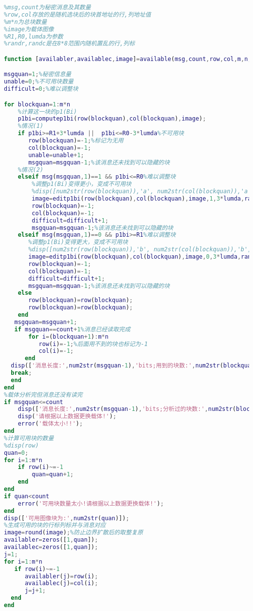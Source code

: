 \documentclass[lang=cn,11pt,a4paper,cite=super]{whureport}
\begin{document}
\begin{lstlisting}[language=Matlab]
%分析可用的图像块与秘密信息对应
%msg,count为秘密消息及其数量
%row,col存放的是随机选块后的块首地址的行,列地址值
%m*n为总块数量
%image为载体图像
%R1,R0,lumda为参数
%randr,randc是在8*8范围内随机置乱的行,列标

function [availabler,availablec,image]=available(msg,count,row,col,m,n,image,R1,R0,lumda,randr,randc);

msgquan=1;%秘密信息量
unable=0;%不可用块数量
difficult=0;%难以调整块

for blockquan=1:m*n
    %计算这一块的p1(Bi)
    p1bi=computep1bi(row(blockquan),col(blockquan),image);
    %情况(1)
    if p1bi>=R1+3*lumda ||  p1bi<=R0-3*lumda%不可用块   
       row(blockquan)=-1;%标记为无用
       col(blockquan)=-1;
       unable=unable+1;
       msgquan=msgquan-1;%该消息还未找到可以隐藏的块 
    %情况(2)
    elseif msg(msgquan,1)==1 && p1bi<=R0%难以调整块
        %调整p1(Bi)变得更小，变成不可用块
        %disp([num2str(row(blockquan)),'a', num2str(col(blockquan)),'a', num2str(msgquan)]);
        image=editp1bi(row(blockquan),col(blockquan),image,1,3*lumda,randr,randc);
        row(blockquan)=-1;
        col(blockquan)=-1;
        difficult=difficult+1;
        msgquan=msgquan-1;%该消息还未找到可以隐藏的块    
    elseif msg(msgquan,1)==0 && p1bi>=R1%难以调整块 
       %调整p1(Bi)变得更大，变成不可用块
       %disp([num2str(row(blockquan)),'b', num2str(col(blockquan)),'b', num2str(msgquan)]);
       image=editp1bi(row(blockquan),col(blockquan),image,0,3*lumda,randr,randc);
       row(blockquan)=-1;
       col(blockquan)=-1;
       difficult=difficult+1;
       msgquan=msgquan-1;%该消息还未找到可以隐藏的块 
    else    
       row(blockquan)=row(blockquan);
       row(blockquan)=row(blockquan);    
    end           
   msgquan=msgquan+1;
   if msgquan==count+1%消息已经读取完成
       for i=(blockquan+1):m*n
          row(i)=-1;%后面用不到的块也标记为-1
          col(i)=-1;
      end
  disp(['消息长度:',num2str(msgquan-1),'bits;用到的块数:',num2str(blockquan),';其中不可用块有:',num2str(unable),';另有',num2str(difficult),'块难以调整块已修改为不可用块'])
  break;    
  end
end
%载体分析完但消息还没有读完
if msgquan<=count  
    disp(['消息长度:',num2str(msgquan-1),'bits;分析过的块数:',num2str(blockquan),';其中不可用块有:',num2str(unable),';另有',num2str(difficult),'块难以调整块已修改为不可用块'])
    disp('请根据以上数据更换载体!');
    error('载体太小!!');
end
%计算可用块的数量
%disp(row)
quan=0; 
for i=1:m*n
    if row(i)~=-1
        quan=quan+1;
    end
end
if quan<count
    error('可用块数量太小!请根据以上数据更换载体!');
end
disp(['可用图像块为:',num2str(quan)]);
%生成可用的块的行标列标并与消息对应
image=round(image);%防止边界扩散后的取整复原
availabler=zeros([1,quan]);
availablec=zeros([1,quan]);
j=1;
for i=1:m*n
   if row(i)~=-1
      availabler(j)=row(i);
      availablec(j)=col(i);
      j=j+1;
  end  
end
\end{lstlisting}
\end{document}
